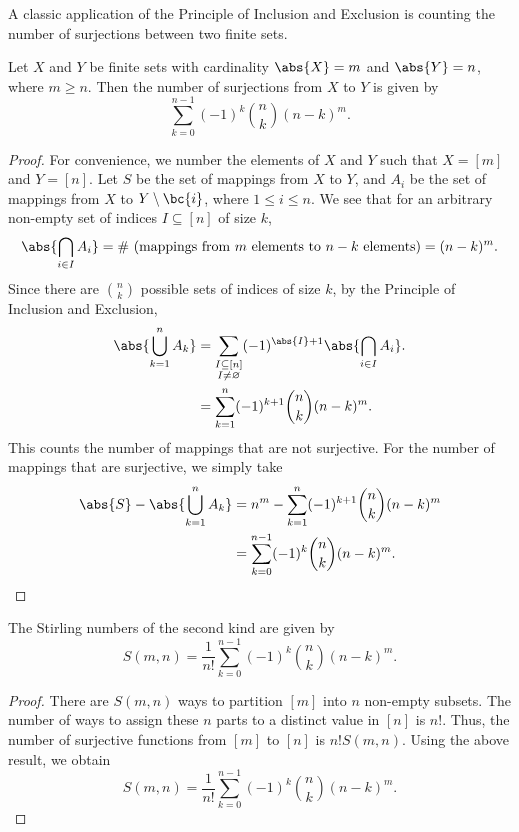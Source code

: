 A classic application of the Principle of Inclusion and Exclusion is counting the number of surjections between two finite sets.

\begin{proposition}
    Let $X$ and $Y$ be finite sets with cardinality $\abs{X} = m$ and $\abs{Y} = n$, where $m \geq n$. Then the number of surjections from $X$ to $Y$ is given by \[\sum_{k = 0}^{n-1} (-1)^k \binom{n}{k} (n-k)^m.\]
\end{proposition}
\begin{proof}
    For convenience, we number the elements of $X$ and $Y$ such that $X = [m]$ and $Y = [n]$. Let $S$ be the set of mappings from $X$ to $Y$, and $A_i$ be the set of mappings from $X$ to $Y\setminus\bc{i}$, where $1 \leq i \leq n$. We see that for an arbitrary non-empty set of indices $I \subseteq [n]$ of size $k$, \[\abs{\bigcap_{i \in I} A_i} = \text{\# (mappings from $m$ elements to $n-k$ elements)} = (n-k)^m.\] Since there are $\binom{n}{k}$ possible sets of indices of size $k$, by the Principle of Inclusion and Exclusion,
    \begin{align*}
        \abs{\bigcup_{k = 1}^n A_k} &= \sum_{\substack{I \subseteq [n]\\I \neq \varnothing}} (-1)^{\abs{I} + 1} \abs{\bigcap_{i \in I} A_i}.\\
        &= \sum_{k = 1}^{n} (-1)^{k+1} \binom{n}{k} (n-k)^m.
    \end{align*}
    This counts the number of mappings that are not surjective. For the number of mappings that are surjective, we simply take
    \begin{align*}
        \abs{S} - \abs{\bigcup_{k = 1}^n A_k} &= n^m - \sum_{k = 1}^{n} (-1)^{k+1} \binom{n}{k} (n-k)^m\\
        &= \sum_{k = 0}^{n-1} (-1)^k \binom{n}{k} (n-k)^m.
    \end{align*}
\end{proof}

\begin{corollary}
    The Stirling numbers of the second kind are given by \[S(m, n) = \frac1{n!} \sum_{k = 0}^{n-1} (-1)^k \binom{n}{k} (n-k)^m.\]
\end{corollary}
\begin{proof}
    There are $S(m,n)$ ways to partition $[m]$ into $n$ non-empty subsets. The number of ways to assign these $n$ parts to a distinct value in $[n]$ is $n!$. Thus, the number of surjective functions from $[m]$ to $[n]$ is $n! S(m,n)$. Using the above result, we obtain \[S(m, n) = \frac1{n!} \sum_{k = 0}^{n-1} (-1)^k \binom{n}{k} (n-k)^m.\]
\end{proof}

